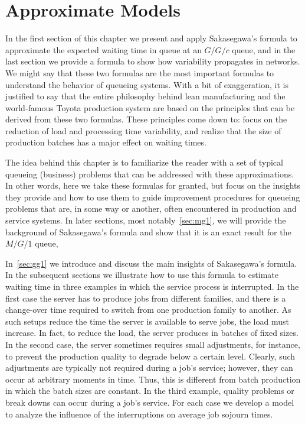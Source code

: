 \chapter{Approximate Models}
\label{cha:approximate-models}
In the first section of this chapter we present and apply Sakasegawa's formula to approximate the expected waiting time in queue at an $G/G/c$ queue, and in the last section we provide a formula to show how variability propagates in networks.
We might say that these two formulas are the most important formulas to understand the behavior of queueing systems.
With a bit of exaggeration, it is justified to say that the entire philosophy behind lean manufacturing and the world-famous Toyota production system are based on the principles that can be derived from these two formulas. These principles come down to: focus on the reduction of load and processing time variability, and realize that the size of production batches has a major effect on waiting times.

The idea behind this chapter is to familiarize the reader with a set of typical queueing (business) problems that can be addressed with these approximations.
In other words, here we take these formulas for granted, but focus on the insights they provide and how to use them to guide improvement procedures for queueing problems that are, in some way or another, often encountered in production and service systems.
In later sections, most notably~\cref{sec:mg1}, we will provide the background of Sakasegawa's formula and show that it is an exact result for the $M/G/1$ queue,

In~\cref{sec:gg1} we introduce and discuss the main insights of Sakasegawa's formula.
In the subsequent sections we illustrate how to use this formula to estimate waiting time in three examples in which the service process is interrupted.
In the first case the server has to produce jobs from different families, and there is a change-over time required to switch from one production family to another.
As such setups reduce the time the server is available to serve jobs, the load must increase.
In fact, to reduce the load, the server produces in batches of fixed sizes.
In the second case, the server sometimes requires small adjustments, for instance, to prevent the production quality to degrade below a certain level.
Clearly, such adjustments are typically not required during a job's service; however, they can occur at arbitrary moments in time.
Thus, this is different from batch production in which the batch sizes are constant.
In the third example, quality problems or break downs can occur during a job's service.
For each case we develop a model to analyze the influence of the interruptions on average job sojourn times.

